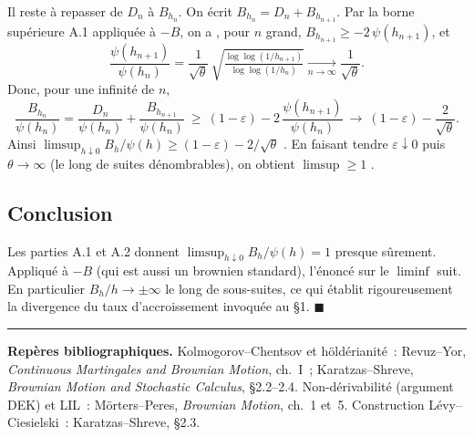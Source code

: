 \documentclass[11pt,a4paper]{article}
\theoremstyle{plain}
\theoremstyle{definition}
\newcommand{\ps}{\text{p.s.}}
\begin{document}
Il reste \`a repasser de $D_n$ \`a $B_{h_n}$. On \'ecrit $B_{h_n}=D_n+B_{h_{n+1}}$. Par la borne sup\'erieure A.1 appliqu\'ee \`a $-B$, on a \ps, pour $n$ grand, $B_{h_{n+1}}\ge -2\,\psi(h_{n+1})$, et
\[
\frac{\psi(h_{n+1})}{\psi(h_n)}=\frac{1}{\sqrt\theta}\,\sqrt{\tfrac{\log\log(1/h_{n+1})}{\log\log(1/h_n)}}\xrightarrow[n\to\infty]{}\frac{1}{\sqrt\theta}.
\]
Donc, pour une infinit\'e de $n$,
\[
\frac{B_{h_n}}{\psi(h_n)}=\frac{D_n}{\psi(h_n)}+\frac{B_{h_{n+1}}}{\psi(h_n)}
\ \ge\ (1-\varepsilon)-2\,\frac{\psi(h_{n+1})}{\psi(h_n)}
\ \xrightarrow[]{}\ (1-\varepsilon)-\frac{2}{\sqrt\theta}.
\]
Ainsi $\limsup_{h\downarrow 0}B_h/\psi(h)\ge(1-\varepsilon)-2/\sqrt\theta$ \ps. En faisant tendre $\varepsilon\downarrow 0$ puis $\theta\to\infty$ (le long de suites d\'enombrables), on obtient $\limsup\ge 1$ \ps.

\subsection*{Conclusion}

Les parties A.1 et A.2 donnent $\limsup_{h\downarrow 0}B_h/\psi(h)=1$ presque s\^urement. Appliqu\'e \`a $-B$ (qui est aussi un brownien standard), l'\'enonc\'e sur le $\liminf$ suit. En particulier $B_h/h\to\pm\infty$ le long de sous-suites, ce qui \'etablit rigoureusement la divergence du taux d'accroissement invoqu\'ee au \S1. \hfill$\blacksquare$

\bigskip
\begin{center}\rule{0.42\textwidth}{0.4pt}\end{center}
\small\noindent\textbf{Rep\`eres bibliographiques.} Kolmogorov--Chentsov et h\"old\'erianit\'e~: Revuz--Yor, \emph{Continuous Martingales and Brownian Motion}, ch.~I~; Karatzas--Shreve, \emph{Brownian Motion and Stochastic Calculus}, \S2.2--2.4. Non-d\'erivabilit\'e (argument DEK) et LIL~: M\"orters--Peres, \emph{Brownian Motion}, ch.~1 et~5. Construction L\'evy--Ciesielski~: Karatzas--Shreve, \S2.3.
\end{document}
